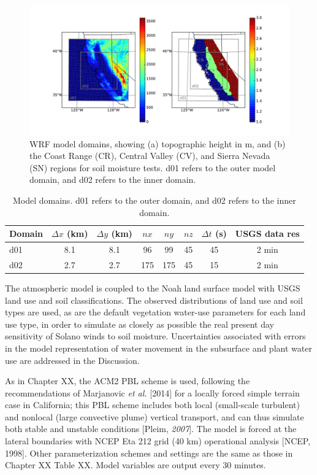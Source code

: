 \begin{figure}[here]
\includegraphics[width=1\textwidth]{ch3-wind/img/domain_map.pdf}
\caption{WRF model domains, showing (a) topographic height in m, and (b) the Coast Range (CR), Central Valley (CV), and Sierra Nevada (SN) regions for soil moisture tests. d01 refers to the outer model domain, and d02 refers to the inner domain.}
\label{fig:windSol_domainmap}
\end{figure}

\begin{table}
\begin{tabular}{ l c c c c c c c }
\hline
Domain & $\Delta x$ (km) & $\Delta y$ (km) & $nx$ & $ny$ & $nz$ & $\Delta t$ (s) & USGS data res \\ \hline
d01 & 8.1 & 8.1 & 96 & 99 & 45 & 45 & 2 min\\
d02 & 2.7 & 2.7 & 175 & 175 & 45 & 15 & 2 min\\
\hline
\end{tabular}
\caption{Model domains. d01 refers to the outer domain, and d02 refers to the inner domain.}
\label{table:windSol_domains}
\end{table}

The atmospheric model is coupled to the Noah land surface model with USGS land use and soil classifications.  The observed distributions of land use and soil types are used, as are the default vegetation water-use parameters for each land use type, in order to simulate as closely as possible the real present day sensitivity of Solano winds to soil moisture.  Uncertainties associated with errors in the model representation of water movement in the subsurface and plant water use are addressed in the Discussion. 

As in Chapter XX, the ACM2 PBL scheme is used, following the recommendations of Marjanovic \textit{et al.} [2014] for a locally forced simple terrain case in California; this PBL scheme includes both local (small-scale turbulent) and nonlocal (large convective plume) vertical transport, and can thus simulate both stable and unstable conditions [Pleim, \textit{2007}].  The model is forced at the lateral boundaries with NCEP Eta 212 grid (40 km) operational analysis [NCEP, 1998].  Other parameterization schemes and settings are the same as those in Chapter XX Table XX.  Model variables are output every 30 minutes.

